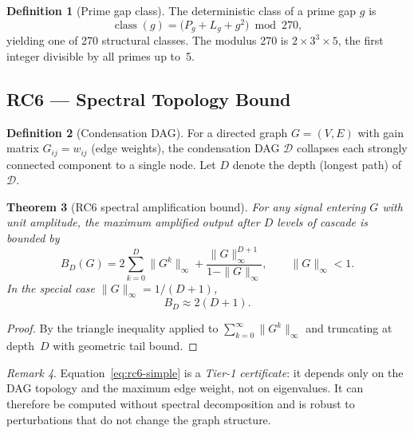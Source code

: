 \documentclass[12pt,a4paper]{article}
\theoremstyle{plain}
\newtheorem{theorem}{Theorem}[section]
\theoremstyle{definition}
\newtheorem{definition}[theorem]{Definition}
\theoremstyle{remark}
\newtheorem{remark}[theorem]{Remark}
\begin{document}
\begin{definition}[Prime gap class]
\label{def:prime-gap-class}
The deterministic class of a prime gap $g$ is
\begin{equation}
\operatorname{class}(g) = \bigl(P_g + L_g + g^2\bigr) \bmod 270,
\end{equation}
yielding one of 270 structural classes.
The modulus 270 is $2\times 3^3\times 5$, the first integer divisible
by all primes up to~5.
\end{definition}

\subsection{RC6 --- Spectral Topology Bound}
\label{sec:rc6}

\begin{definition}[Condensation DAG]
For a directed graph $G = (V,E)$ with gain matrix
$G_{ij} = w_{ij}$ (edge weights), the condensation DAG $\mathcal{D}$
collapses each strongly connected component to a single node.
Let $D$ denote the depth (longest path) of $\mathcal{D}$.
\end{definition}

\begin{theorem}[RC6 spectral amplification bound]
\label{thm:rc6}
For any signal entering $G$ with unit amplitude, the maximum amplified
output after $D$ levels of cascade is bounded by
\begin{equation}
B_D(G) = 2\sum_{k=0}^{D} \|G^k\|_\infty
          + \frac{\|G\|_\infty^{D+1}}{1 - \|G\|_\infty},
\qquad \|G\|_\infty < 1.
\label{eq:rc6}
\end{equation}
In the special case $\|G\|_\infty = 1/(D+1)$,
\begin{equation}
B_D \approx 2(D+1).
\label{eq:rc6-simple}
\end{equation}
\end{theorem}

\begin{proof}
By the triangle inequality applied to $\sum_{k=0}^{\infty}\|G^k\|_\infty$
and truncating at depth~$D$ with geometric tail bound.
\end{proof}

\begin{remark}
Equation~\eqref{eq:rc6-simple} is a \emph{Tier-1 certificate}: it depends
only on the DAG topology and the maximum edge weight, not on
eigenvalues.  It can therefore be computed without spectral
decomposition and is robust to perturbations that do not change the
graph structure.
\end{remark}
\end{document}

